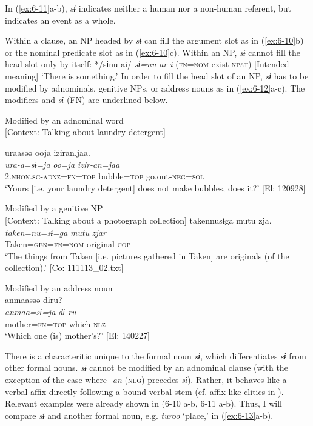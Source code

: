 In (\ref{ex:6-11}a-b), \textit{sɨ} indicates neither a human nor a non-human referent, but indicates an event as a whole.

  Within a clause, an NP headed by \textit{sɨ} can fill the argument slot as in (\ref{ex:6-10}b) or the nominal predicate slot as in (\ref{ex:6-10}c). Within an NP, \textit{sɨ} cannot fill the head slot only by itself: */sɨnu ai/ \textit{sɨ=nu} \textit{ar-i} (\textsc{fn}=\textsc{nom} exist-\textsc{npst}) [Intended meaning] ‘There is something.’ In order to fill the head slot of an NP, \textit{sɨ} has to be modified by adnominals, genitive NPs, or address nouns as in (\ref{ex:6-12}a-c). The modifiers and \textit{sɨ} (FN) are underlined below.

\ea\label{ex:6-12}
\ea Modified by an adnominal word\\{}
[Context: Talking about laundry detergent]

{\TM}
\glll uraasəə  ooja  iziran.jaa.\\
      \textit{ura-a=sɨ=ja}  \textit{oo=ja}  \textit{izir-an=jaa}\\
      2.\textsc{nhon}.\textsc{sg}-\textsc{adnz}=\textsc{fn}=\textsc{top}  bubble=\textsc{top}  go.out-\textsc{neg}=\textsc{sol}\\
\glt ‘Yours [i.e. your laundry detergent] does not make bubbles, does it?’ [El: 120928]

\ex Modified by a genitive NP\\{}
[Context: Talking about a photograph collection]
{\TM}
\glll {\textbar}taken{\textbar}nusɨga  mutu  zja.\\
      \textit{taken=nu=sɨ=ga}  \textit{mutu}  \textit{zjar}\\
      Taken=\textsc{gen}=\textsc{fn}=\textsc{nom}  original  \textsc{cop}\\
\glt ‘The things from Taken [i.e. pictures gathered in Taken] are originals (of the collection).’ [Co: 111113\_02.txt]

\ex Modified by an address noun\\
{\TM}
\glll  anmaasəə  dɨru?\\
\textit{anmaa=sɨ=ja}  \textit{dɨ-ru}\\
mother=\textsc{fn}=\textsc{top}  which-\textsc{nlz}\\
\glt ‘Which one (is) mother’s?’ [El: 140227]
\z

There is a characteritic unique to the formal noun \textit{sɨ}, which differentiates \textit{sɨ} from other formal nouns. \textit{sɨ} cannot be modified by an adnominal clause (with the exception of the case where \textit{-an} (\textsc{neg}) precedes \textit{sɨ}). Rather, it behaves like a verbal affix directly following a bound verbal stem (cf. affix-like clitics in ). Relevant examples were already shown in (6-10 a-b, 6-11 a-b). Thus, I will compare \textit{sɨ} and another formal noun, e.g. \textit{turoo} ‘place,’ in (\ref{ex:6-13}a-b).

